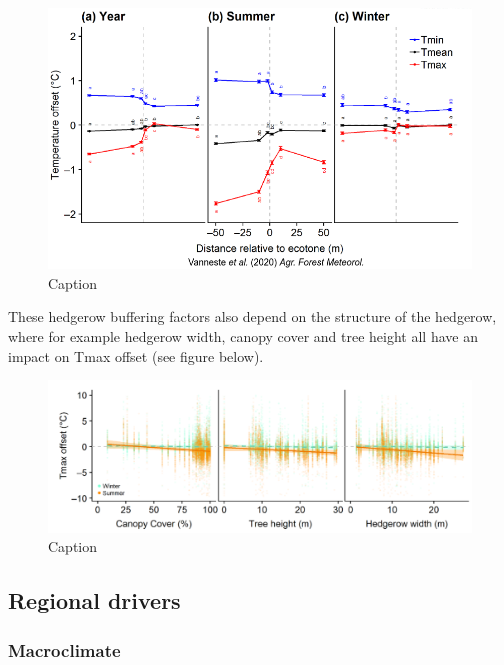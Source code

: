 \documentclass[12pt,oneside]{book}
\begin{document}
\begin{figure}

{\centering \includegraphics[width=1\linewidth]{figures/Figure1029} 

}

\caption{Caption}\label{fig:Micro29}
\end{figure}

These hedgerow buffering factors also depend on the structure of the
hedgerow, where for example hedgerow width, canopy cover and tree height
all have an impact on Tmax offset (see figure below).

\begin{figure}

{\centering \includegraphics[width=1\linewidth]{figures/Figure1030} 

}

\caption{Caption}\label{fig:Micro30}
\end{figure}

\subsection{Regional drivers}\label{regional-drivers}

\subsubsection{Macroclimate}\label{macroclimate}
\end{document}
